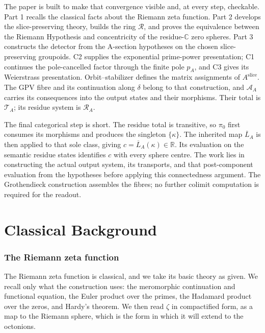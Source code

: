 \documentclass[11pt]{article}
\newcommand{\CC}{\mathbb{C}}
\newcommand{\RR}{\mathbb{R}}
\theoremstyle{plain}
\theoremstyle{definition}
\theoremstyle{remark}
\begin{document}
The paper is built to make that convergence visible and, at every step, checkable.
Part 1 recalls the classical facts about the Riemann zeta function. Part 2 develops
the slice-preserving theory, builds the ring $\mathcal R$, and proves the equivalence
between the Riemann Hypothesis and concentricity of the residue-$\CC$ zero spheres.
Part 3 constructs the detector from the A-section hypotheses on the chosen
slice-preserving groupoids. C2 supplies the exponential prime-power presentation;
C1 continues the pole-cancelled factor through the finite pole $p_A$, and C3 gives
its Weierstrass presentation. Orbit--stabilizer defines the matrix assignments of
$A^{\mathrm{slice}}$. The GPV fibre and its continuation along $\delta$ belong to
that construction, and $\mathcal A_A$ carries its consequences into the output
states and their morphisms. Their total is $\mathcal T_A$; its residue system is
$\mathcal R_A$.

The final categorical step is short. The residue total is transitive, so
$\pi_0$ first consumes its morphisms and produces the singleton $\{\kappa\}$.
The inherited map $\overline L_A$ is then applied to that sole class, giving
$c=\overline L_A(\kappa)\in\RR$. Its evaluation on the semantic residue states
identifies $c$ with every sphere centre. The work lies in constructing the
actual output system, its transports, and that post-component evaluation from
the hypotheses before applying this connectedness argument. The Grothendieck
construction assembles the fibres; no further colimit computation is required
for the readout.


\part{Classical Background}
\section{The Riemann zeta function}

The Riemann zeta function is classical, and we take its basic theory as given. We recall only what
the construction uses: the meromorphic continuation and functional equation, the Euler product over
the primes, the Hadamard product over the zeros, and Hardy's theorem. We then read $\zeta$ in
compactified form, as a map to the Riemann sphere, which is the form in which it will extend to the
octonions.
\end{document}

